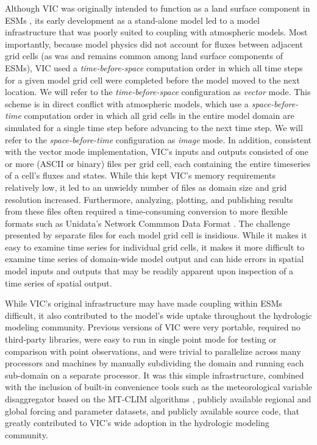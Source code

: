 \documentclass[gmd, manuscript]{copernicus}
\begin{document}
  Although VIC was originally intended to function as a land surface component in ESMs \citep{Liang_1994}, its early development as a stand-alone model led to a model infrastructure that was poorly suited to coupling with atmospheric models.  Most importantly, because model physics did not account for fluxes between adjacent grid cells (as was and remains common among land surface components of ESMs), VIC used a \textit{time-before-space} computation order in which all time steps for a given model grid cell were completed before the model moved to the next location. We will refer to the \textit{time-before-space} configuration as \textit{vector} mode.  This scheme is in direct conflict with atmospheric models, which use a \textit{space-before-time} computation order in which all grid cells in the entire model domain are simulated for a single time step before advancing to the next time step. We will refer to the \textit{space-before-time} configuration as \textit{image} mode. In addition, consistent with the vector mode implementation, VIC's inputs and outputs consisted of one or more (ASCII or binary) files per grid cell, each containing the entire timeseries of a cell's fluxes and states. While this kept VIC's memory requirements relatively low, it led to an unwieldy number of files as domain size and grid resolution increased. Furthermore, analyzing, plotting, and publishing results from these files often required a time-consuming conversion to more flexible formats such as Unidata's Network Commmon Data Format \citep[NetCDF; ][]{Rew_1990}. The challenge presented by separate files for each model grid cell is insidious. While it makes it easy to examine time series for individual grid cells, it makes it more difficult to examine time series of domain-wide model output and can hide errors in spatial model inputs and outputs that may be readily apparent upon inspection of a time series of spatial output.

  While VIC's original infrastructure may have made coupling within ESMs difficult, it also contributed to the model's wide uptake throughout the hydrologic modeling community. Previous versions of VIC were very portable, required no third-party libraries, were easy to run in single point mode for testing or comparison with point observations, and were trivial to parallelize across many processors and machines by manually subdividing the domain and running each sub-domain on a separate processor. It was this simple infrastructure, combined with the inclusion of built-in convenience tools such as the meteorological variable disaggregator based on the MT-CLIM algorithms \citep{Thornton_1999,Bohn_2013}, publicly available regional and global forcing and parameter datasets, and publicly available source code, that greatly contributed to VIC's wide adoption in the hydrologic modeling community.
\end{document}

